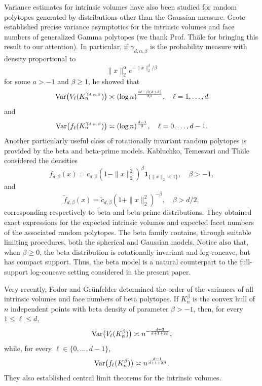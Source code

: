 \documentclass[10pt]{amsart}
\newcommand{\1}{\textbf{1}}
\newcommand{\Var}{{\rm Var}}
\numberwithin{equation}{section} %
\theoremstyle{remark}
\theoremstyle{definition}
\begin{document}
Variance estimates for intrinsic volumes have also been studied for random
polytopes generated by distributions other than the Gaussian measure. Grote \cite{GroteGamma} established precise variance asymptotics for the intrinsic volumes and face numbers of generalized Gamma polytopes (we thank Prof. Th\"ale for bringing this result to our attention). In particular, if $\gamma_{d,\alpha,\beta}$ is the probability measure with density proportional to \[\|x\|_2^\alpha e^{-\|x\|_2^\beta/\beta}\] for some $a>-1$ and $\beta \geq 1$, he showed that \[\Var\bigl(V_\ell(K_n^{\gamma_{d,\alpha,\beta}})\bigr) \asymp ( \log n)^{\frac{4\ell-\beta(d+3)}{2\beta}}, \quad \ell=1,\ldots,d\] and \[\Var\bigl( f_\ell(K_n^{\gamma_{d,\alpha,\beta}})\bigr) \asymp (\log n)^{\frac{d-1}{2}}, \quad \ell=0,\ldots,d-1.\]Another particularly useful class of rotationally invariant random polytopes is
provided by the beta and beta-prime models. Kabluchko, Temesvari and
Th\"ale \cite{Kab-Tem-Tha} considered the densities
\[
    f_{d,\beta}(x)
    =
    c_{d,\beta}(1-\|x\|_2^2)^\beta
    \mathbf{1}_{\{\|x\|_2<1\}},
    \quad \beta>-1,
\]
and
\[
    \widetilde f_{d,\beta}(x)
    =
    \widetilde c_{d,\beta}(1+\|x\|_2^2)^{-\beta},
    \quad \beta> d/2,
\]
corresponding respectively to beta and beta-prime distributions. They
obtained exact expressions for the expected intrinsic volumes and expected
facet numbers of the associated random polytopes. The beta family contains, through suitable limiting procedures, both the spherical and Gaussian models. Notice also that, when $\beta\geq0$, the beta distribution is rotationally
invariant and log-concave, but has compact support. Thus, the beta model is a
natural counterpart to the full-support log-concave setting considered in
the present paper.

Very recently, Fodor and Gr\"unfelder \cite{Fod-Gru} determined the order of
the variances of all intrinsic volumes and face numbers of beta polytopes.
If $K_n^\beta$ is the convex hull of $n$ independent points with beta
density of parameter $\beta>-1$, then, for every
$1\leq\ell\leq d$,
\[
    \Var\bigl(V_\ell(K_n^\beta)\bigr)
    \asymp
    n^{-\frac{d+3}{d+1+2\beta}},
\]
while, for every $\ell\in\{0,\ldots,d-1\}$,
\[
    \Var\bigl(f_\ell(K_n^\beta)\bigr)
    \asymp
    n^{\frac{d-1}{d+1+2\beta}}.
\]
They also established central limit theorems for the intrinsic volumes.
\end{document}
